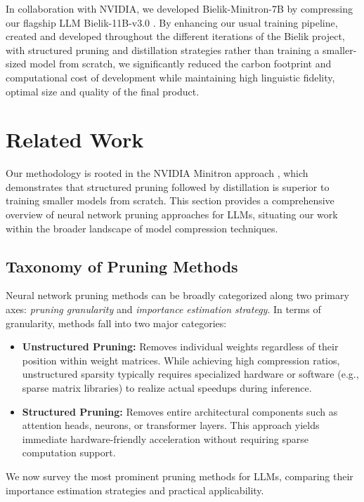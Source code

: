 \documentclass{article}
\begin{document}
In collaboration with NVIDIA, we developed Bielik-Minitron-7B by compressing our flagship LLM Bielik-11B-v3.0 \cite{Bielik11Bv3i}. By enhancing our usual training pipeline, created and developed throughout the different iterations of the Bielik project, with structured pruning and distillation strategies rather than training a smaller-sized model from scratch, we significantly reduced the carbon footprint and computational cost of development while maintaining high linguistic fidelity, optimal size and quality of the final product.

\section{Related Work}

Our methodology is rooted in the NVIDIA Minitron approach \cite{sreenivas2024llm, muralidharan2024compact}, which demonstrates that structured pruning followed by distillation is superior to training smaller models from scratch. This section provides a comprehensive overview of neural network pruning approaches for LLMs, situating our work within the broader landscape of model compression techniques.

\subsection{Taxonomy of Pruning Methods}

Neural network pruning methods can be broadly categorized along two primary axes: \emph{pruning granularity} and \emph{importance estimation strategy}. In terms of granularity, methods fall into two major categories:

\begin{itemize}
    \item \textbf{Unstructured Pruning:} Removes individual weights regardless of their position within weight matrices. While achieving high compression ratios, unstructured sparsity typically requires specialized hardware or software (e.g., sparse matrix libraries) to realize actual speedups during inference.
    \item \textbf{Structured Pruning:} Removes entire architectural components such as attention heads, neurons, or transformer layers. This approach yields immediate hardware-friendly acceleration without requiring sparse computation support.
\end{itemize}

We now survey the most prominent pruning methods for LLMs, comparing their importance estimation strategies and practical applicability.
\end{document}
